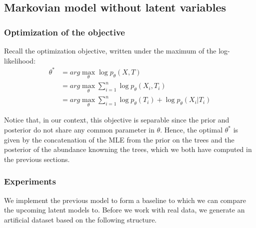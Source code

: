 \subsection{Markovian model without latent variables}





\subsubsection{Optimization of the objective}

Recall the optimization objective, written under the maximum of the log-likelihood:
$$
\begin{align}
    \theta^* &= arg \max_{\theta} \log p_{\theta}(X,T) \\
            &= arg \max_{\theta} \sum_{i=1}^n \log p_{\theta}(X_i, T_i) \\
            &= arg \max_{\theta} \sum_{i=1}^n \log p_{\theta}(T_i) + \log p_{\theta}(X_i | T_i)
\end{align}
$$

Notice that, in our context, this objective is separable since the prior and posterior do not share any common parameter in $\theta$.
Hence, the optimal $\theta^*$ is given by the concatenation of the MLE from the prior on the trees and the posterior of the abundance knowning the trees,
which we both have computed in the previous sections.

\subsubsection{Experiments}

We implement the previous model to form a baseline to which we can compare the upcoming latent models to.
Before we work with real data, we generate an artificial dataset based on the following structure.

